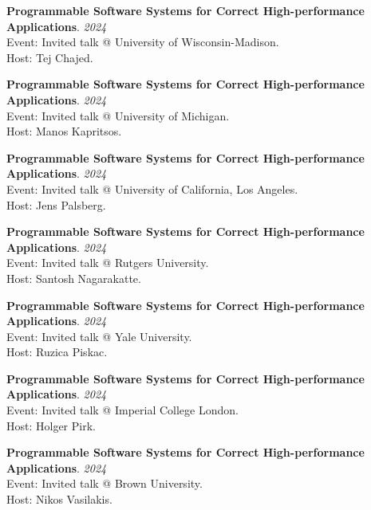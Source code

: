 \begin{minipage}{\textwidth}
\textbf{Programmable Software Systems for Correct High-performance Applications}. \hfill {\em 2024}\\
Event: Invited talk @ University of Wisconsin-Madison.\\
 Host: Tej Chajed.
\end{minipage}

\begin{minipage}{\textwidth}
\textbf{Programmable Software Systems for Correct High-performance Applications}. \hfill {\em 2024}\\
Event: Invited talk @ University of Michigan.\\
 Host: Manos Kapritsos.
\end{minipage}

\begin{minipage}{\textwidth}
\textbf{Programmable Software Systems for Correct High-performance Applications}. \hfill {\em 2024}\\
Event: Invited talk @ University of California, Los Angeles.\\
 Host: Jens Palsberg.
\end{minipage}

\begin{minipage}{\textwidth}
\textbf{Programmable Software Systems for Correct High-performance Applications}. \hfill {\em 2024}\\
Event: Invited talk @ Rutgers University.\\
 Host: Santosh Nagarakatte.
\end{minipage}

\begin{minipage}{\textwidth}
\textbf{Programmable Software Systems for Correct High-performance Applications}. \hfill {\em 2024}\\
Event: Invited talk @ Yale University.\\
 Host: Ruzica Piskac.
\end{minipage}

\begin{minipage}{\textwidth}
\textbf{Programmable Software Systems for Correct High-performance Applications}. \hfill {\em 2024}\\
Event: Invited talk @ Imperial College London.\\
 Host: Holger Pirk.
\end{minipage}

\begin{minipage}{\textwidth}
\textbf{Programmable Software Systems for Correct High-performance Applications}. \hfill {\em 2024}\\
Event: Invited talk @ Brown University.\\
 Host: Nikos Vasilakis.
\end{minipage}

